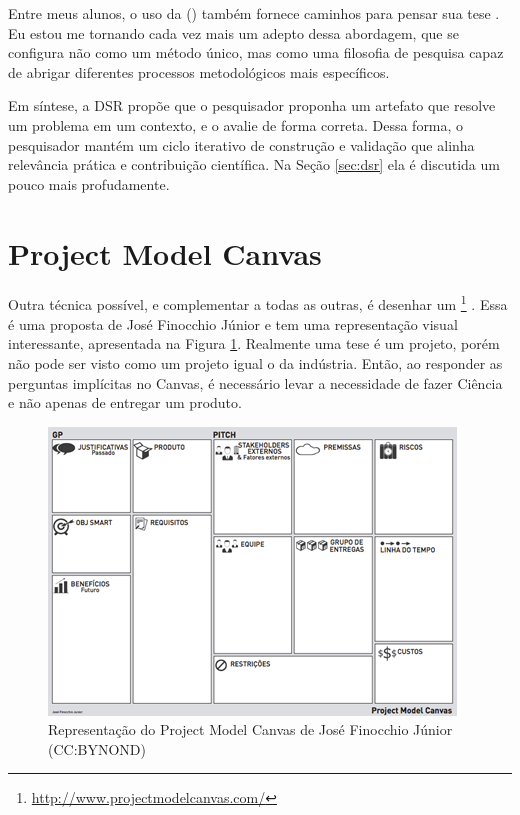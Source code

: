 Entre meus alunos, o uso da  ()\citep{pimentel2023} também fornece caminhos para pensar sua tese . Eu estou me tornando cada vez mais um adepto dessa abordagem, 
que se configura não como um método único, mas como uma filosofia de pesquisa  
capaz de abrigar diferentes processos metodológicos mais específicos\citep{hevner2004design,Dresch2014,march1995design,pimentel2023}.

Em síntese, a DSR propõe que o pesquisador proponha um artefato que resolve um problema em um contexto, e o avalie de forma correta\citep{pimentel2023}.  
Dessa forma, o pesquisador mantém um ciclo iterativo de construção e validação que alinha relevância prática e contribuição científica. Na Seção \ref{sec:dsr} ela é discutida um pouco mais profudamente.

\section{Project Model Canvas}

Outra técnica possível, e complementar a todas as outras, é desenhar um \footnote{\url{http://www.projectmodelcanvas.com/}} . Essa é uma proposta de José Finocchio Júnior e tem uma representação visual interessante, apresentada na Figura \ref{fig:pmc}. Realmente uma tese é um projeto, porém não pode ser visto como um projeto igual o da indústria. Então, ao responder as perguntas implícitas no Canvas, é necessário levar a necessidade de fazer Ciência e não apenas de entregar um produto.

\begin{figure}
    \centering
    \includegraphics[width=0.7\linewidth]{Images/PMC}
    \caption{Representação do Project Model Canvas de José Finocchio Júnior (CC:BYNOND)}
    \label{fig:pmc}
\end{figure}


